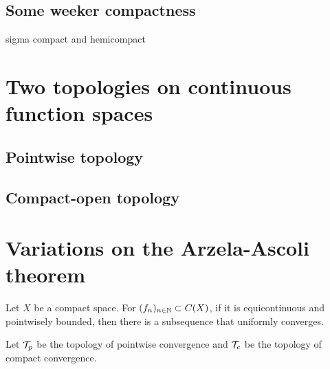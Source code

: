 \documentclass{../exp}
\begin{document}
\subsection{Some weeker compactness}
sigma compact and hemicompact







\section{Two topologies on continuous function spaces}
\subsection{Pointwise topology}

\subsection{Compact-open topology}











\section{Variations on the Arzela-Ascoli theorem}

\begin{thm}
Let $X$ be a compact space.
For $(f_n)_{n\in\mathbb{N}}\subset C(X)$, if it is equicontinuous and pointwisely bounded, then there is a subsequence that uniformly converges.
\end{thm}

Let $\mathcal{T}_p$ be the topology of pointwise convergence and $\mathcal{T}_c$ be the topology of compact convergence.
\end{document}
